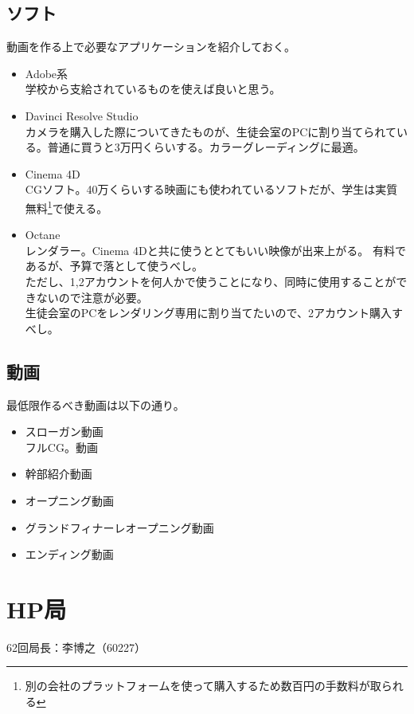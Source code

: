 \documentclass[dvipdfmx,11pt]{jarticle}
\begin{document}
\subsection{ソフト}
 動画を作る上で必要なアプリケーションを紹介しておく。
 \begin{itemize}
  \item Adobe系\\
  学校から支給されているものを使えば良いと思う。
  \item Davinci Resolve Studio\\
  カメラを購入した際についてきたものが、生徒会室のPCに割り当てられている。普通に買うと3万円くらいする。カラーグレーディングに最適。
  \item Cinema 4D\\
  CGソフト。40万くらいする映画にも使われているソフトだが、学生は実質無料\footnote{別の会社のプラットフォームを使って購入するため数百円の手数料が取られる}で使える。
  \item Octane\\
  レンダラー。Cinema 4Dと共に使うととてもいい映像が出来上がる。
  有料であるが、予算で落として使うべし。\\ただし、1,2アカウントを何人かで使うことになり、同時に使用することができないので注意が必要。\\生徒会室のPCをレンダリング専用に割り当てたいので、2アカウント購入すべし。
 \end{itemize}
\subsection{動画}
最低限作るべき動画は以下の通り。
 \begin{itemize}
  \item スローガン動画\\
  フルCG。動画
  \item 幹部紹介動画
  \item オープニング動画
  \item グランドフィナーレオープニング動画
  \item エンディング動画
 \end{itemize}
 
 \section{HP局}
 62回局長：李博之（60227）
\end{document}
